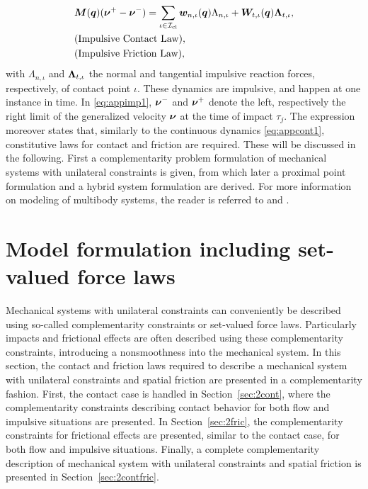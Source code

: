 \documentclass[../DC2019003Bouma.tex]{subfiles}
\begin{document}
\begin{align}
&{\boldsymbol{M}}({\boldsymbol{q}})(\boldsymbol{\nu}^+ - \boldsymbol{\nu}^-) = \sum_{\iota\in\mathcal{I}_{\text{cl}}} {\boldsymbol{w}}_{n,\iota}({\boldsymbol{q}})\Lambda_{n,\iota} + {\boldsymbol{W}}_{t,\iota}({\boldsymbol{q}})\boldsymbol{\Lambda}_{t,\iota}, \label{eq:appimp1}\\
&\text{(Impulsive Contact Law)},\nonumber\\
&\text{(Impulsive Friction Law)},\nonumber
\end{align}
with $\Lambda_{n,\iota}$ and $\boldsymbol{\Lambda}_{t,\iota}$ the normal and tangential impulsive reaction forces, respectively, of contact point $\iota$. These dynamics are impulsive, and happen at one instance in time. In \eqref{eq:appimp1}, $\boldsymbol{\nu}^-$ and $\boldsymbol{\nu}^+$ denote the left, respectively the right limit of the generalized velocity $\boldsymbol{\nu}$ at the time of impact $\tau_j$. The expression moreover states that, similarly to the continuous dynamics \eqref{eq:appcont1}, constitutive laws for contact and friction are required. These will be discussed in the following. First a complementarity problem formulation of mechanical systems with unilateral constraints is given, from which later a proximal point formulation and a hybrid system formulation are derived. For more information on modeling of multibody systems, the reader is referred to \cite{Leine2008} and \cite{Wouw2016}.

\section{Model formulation including set-valued force laws}\label{sec:comp}
Mechanical systems with unilateral constraints can conveniently be described using so-called complementarity constraints or set-valued force laws. Particularly impacts and frictional effects are often described using these complementarity constraints, introducing a nonsmoothness into the mechanical system. In this section, the contact and friction laws required to describe a mechanical system with unilateral constraints and spatial friction are presented in a complementarity fashion. First, the contact case is handled in Section~\ref{sec:2cont}, where the complementarity constraints describing contact behavior for both flow and impulsive situations are presented. In Section~\ref{sec:2fric}, the complementarity constraints for frictional effects are presented, similar to the contact case, for both flow and impulsive situations. Finally, a complete complementarity description of mechanical system with unilateral constraints and spatial friction is presented in Section~\ref{sec:2contfric}.
\end{document}
